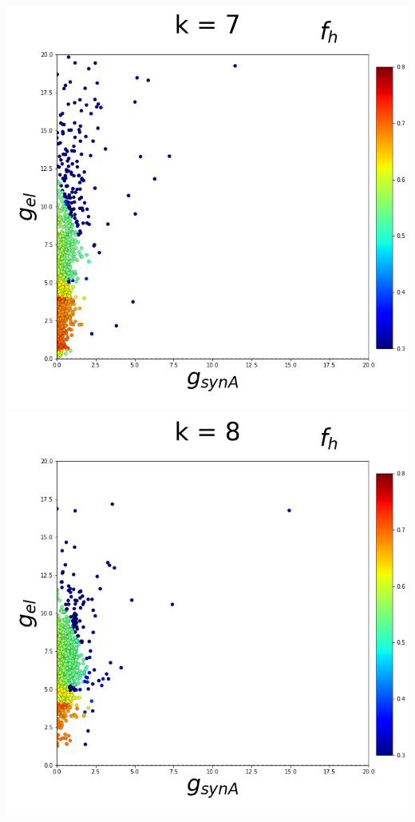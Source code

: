 \documentclass[11pt]{article}
\begin{document}
\begin{center}
\includegraphics[scale=0.125]{DSN_figs/STGCircuit_DSN_c=0_rs=3_k=7.png}
\includegraphics[scale=0.125]{DSN_figs/STGCircuit_DSN_c=0_rs=3_k=8.png}

\end{center}
\end{document}

